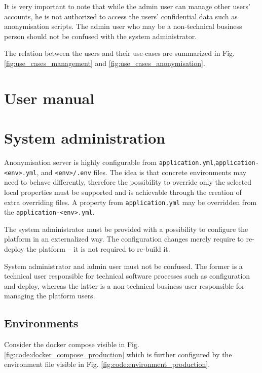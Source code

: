 \documentclass[a4paper,twoside,12pt]{book}
\begin{document}
It is very important to note that while the admin user can manage other users' accounts, he is not authorized to access the users' confidential data such as anonymisation scripts. The admin user who may be a non-technical business person should not be confused with the system administrator.

The relation between the users and their use-cases are summarized in Fig. \ref{fig:use_cases_management} and \ref{fig:use_cases_anonymisation}.

\section{User manual}

\section{System administration}

Anonymisation server is highly configurable from \verb|application.yml|,\newline \verb|application-<env>.yml|, and \verb|<env>/.env| files. The idea is that concrete environments may need to behave differently, therefore the possibility to override only the selected local properties must be supported and is achievable through the creation of extra overriding files. A property from \verb|application.yml| may be overridden from the \verb|application-<env>.yml|.

The system administrator must be provided with a possibility to configure the platform in an externalized way. The configuration changes merely require to re-deploy the platform -- it is not required to re-build it.

System administrator and admin user must not be confused. The former is a technical user responsible for technical software processes such as configuration and deploy, whereas the latter is a non-technical business user responsible for managing the platform users.

\subsection{Environments}

Consider the docker compose visible in Fig. \ref{fig:code:docker_compose_production} which is further configured by the environment file visible in Fig. \ref{fig:code:environment_production}.
\end{document}
